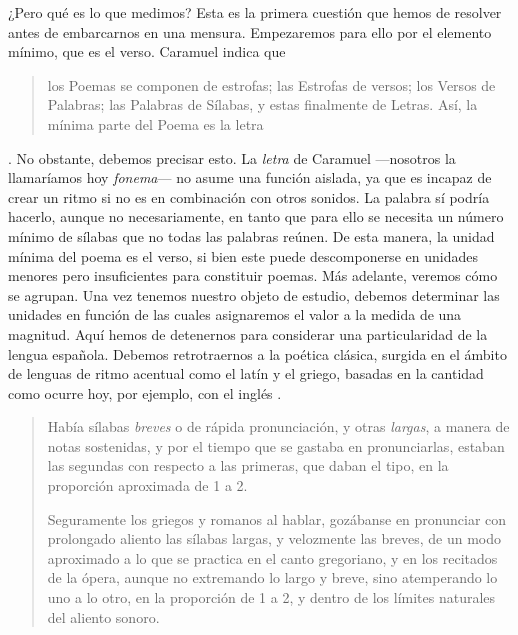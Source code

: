 ¿Pero qué es lo que medimos? Esta es la primera cuestión que hemos de resolver antes de embarcarnos en una mensura. Empezaremos para ello por el elemento mínimo, que es el verso. Caramuel indica que \blockquote{los Poemas se componen de estrofas; las Estrofas de versos; los Versos de Palabras; las Palabras de Sílabas, y estas finalmente de Letras. Así, la mínima parte del Poema es la letra} \parencite[p. 35; mayúsculas en el original]{caramuel2007}. No obstante, debemos precisar esto. La \textit{letra} de Caramuel —nosotros la llamaríamos hoy \textit{fonema}— no asume una función aislada, ya que es incapaz de crear un ritmo si no es en combinación con otros sonidos. La palabra sí podría hacerlo, aunque no necesariamente, en tanto que para ello se necesita un número mínimo de sílabas que no todas las palabras reúnen. De esta manera, la unidad mínima del poema es el verso, si bien este puede descomponerse en unidades menores pero insuficientes para constituir poemas. Más adelante, veremos cómo se agrupan. Una vez tenemos nuestro objeto de estudio, debemos determinar las unidades en función de las cuales asignaremos el valor a la medida de una magnitud. Aquí hemos de detenernos para considerar una particularidad de la lengua española. Debemos retrotraernos a la poética clásica, surgida en el ámbito de lenguas de ritmo acentual como el latín y el griego, basadas en la cantidad como ocurre hoy, por ejemplo, con el inglés \parencite[21]{quilis2013}.
\blockquote[{\cite[307]{bello1981}}]{Había sílabas \textit{breves} o de rápida pronunciación, y otras \textit{largas}, a manera de notas sostenidas, y por el tiempo que se gastaba en pronunciarlas, estaban las segundas con respecto a las primeras, que daban el tipo, en la proporción aproximada de 1 a 2.
		
Seguramente los griegos y romanos al hablar, gozábanse en pronunciar con prolongado aliento las sílabas largas, y velozmente las breves, de un modo aproximado a lo que se practica en el canto gregoriano, y en los recitados de la ópera, aunque no extremando lo largo y breve, sino atemperando lo uno a lo otro, en la proporción de 1 a 2, y dentro de los límites naturales del aliento sonoro.}

